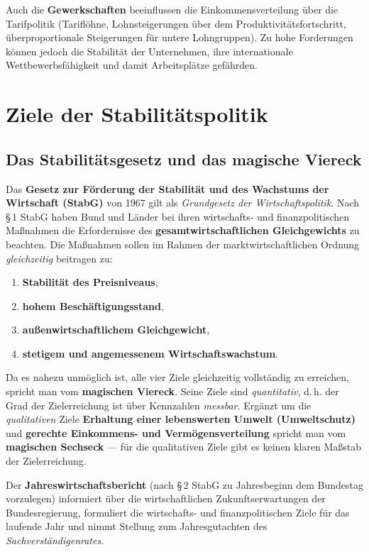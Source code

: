 \documentclass[11pt, a4paper]{article}
\begin{document}
Auch die \textbf{Gewerkschaften} beeinflussen die Einkommensverteilung über die
Tarifpolitik (Tariflöhne, Lohnsteigerungen über dem Produktivitätsfortschritt,
überproportionale Steigerungen für untere Lohngruppen). Zu hohe Forderungen können jedoch
die Stabilität der Unternehmen, ihre internationale Wettbewerbsfähigkeit und damit
Arbeitsplätze gefährden.

\section{Ziele der Stabilitätspolitik}

\subsection{Das Stabilitätsgesetz und das magische Viereck}

Das \textbf{Gesetz zur Förderung der Stabilität und des Wachstums der Wirtschaft (StabG)}
von 1967 gilt als \emph{Grundgesetz der Wirtschaftspolitik}. Nach \S\,1 StabG haben Bund
und Länder bei ihren wirtschafts- und finanzpolitischen Maßnahmen die Erfordernisse des
\textbf{gesamtwirtschaftlichen Gleichgewichts} zu beachten. Die Maßnahmen sollen im Rahmen
der marktwirtschaftlichen Ordnung \emph{gleichzeitig} beitragen zu:

\begin{enumerate}
  \item \textbf{Stabilität des Preisniveaus},
  \item \textbf{hohem Beschäftigungsstand},
  \item \textbf{außenwirtschaftlichem Gleichgewicht},
  \item \textbf{stetigem und angemessenem Wirtschaftswachstum}.
\end{enumerate}

Da es nahezu unmöglich ist, alle vier Ziele gleichzeitig vollständig zu erreichen, spricht
man vom \textbf{magischen Viereck}. Seine Ziele sind \emph{quantitativ}, d.\,h. der Grad
der Zielerreichung ist über Kennzahlen \emph{messbar}. Ergänzt um die \emph{qualitativen}
Ziele \textbf{Erhaltung einer lebenswerten Umwelt (Umweltschutz)} und \textbf{gerechte
Einkommens- und Vermögensverteilung} spricht man vom \textbf{magischen Sechseck} --- für
die qualitativen Ziele gibt es keinen klaren Maßstab der Zielerreichung.

Der \textbf{Jahreswirtschaftsbericht} (nach \S\,2 StabG zu Jahresbeginn dem Bundestag
vorzulegen) informiert über die wirtschaftlichen Zukunftserwartungen der Bundesregierung,
formuliert die wirtschafts- und finanzpolitischen Ziele für das laufende Jahr und nimmt
Stellung zum Jahresgutachten des \emph{Sachverständigenrates}.
\end{document}
